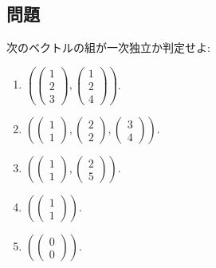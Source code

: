 \subsection{問題}
\begin{quiz}
  次のベクトルの組が一次独立か判定せよ:
  \begin{enumerate}
    \item $(\begin{pmatrix}1\\2\\3\end{pmatrix},\begin{pmatrix}1\\2\\4\end{pmatrix})$.
    \item $(\begin{pmatrix}1\\1\end{pmatrix},\begin{pmatrix}2\\2\end{pmatrix},\begin{pmatrix}3\\4\end{pmatrix})$.
    \item $(\begin{pmatrix}1\\1\end{pmatrix},\begin{pmatrix}2\\5\end{pmatrix})$.
    \item $(\begin{pmatrix}1\\1\end{pmatrix})$.
    \item $(\begin{pmatrix}0\\0\end{pmatrix})$.
  \end{enumerate}
\end{quiz}


